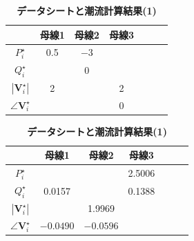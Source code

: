 \documentclass[tombow,dvipdfmx]{corona-a5-1.1}
\begin{document}
\begin{table}[h]
\medskip
\caption{\textbf{データシートと潮流計算結果(1)}} \label{table:pflow1}
 \centering
  {
  \begin{minipage}{0.49\linewidth}
    \centering
  \begin{tabular}{|c|c|c|c|c|c|c|}
   \hline
 &  母線1 & 母線2 & 母線3 \\
   \hline 
   $P_i^{\star}$ & 0.5 & $-3$ & \\
   \hline
   $Q_i^{\star}$ &  & 0 & \\
   \hline
   $|\bm{V}_i^{\star}|$ & 2 & & 2 \\
   \hline
   $\angle \bm{V}_i^{\star}$ & & & 0 \\
   \hline
  \end{tabular}
  \end{minipage}
  \begin{minipage}{0.49\linewidth}
    \centering
  \begin{tabular}{|c|c|c|c|c|c|c|}
   \hline
 &  母線1 & 母線2 & 母線3 \\
   \hline 
   $P_i^{\star}$ & & & 2.5006 \\
   \hline
   $Q_i^{\star}$ & 0.0157 & & 0.1388 \\
   \hline
   $|\bm{V}_i^{\star}|$ & & 1.9969 & \\
   \hline
   $\angle \bm{V}_i^{\star}$ & $-0.0490$ & $-0.0596$ & \\
   \hline
  \end{tabular}
  \end{minipage}
  }
\end{table}
\end{document}
